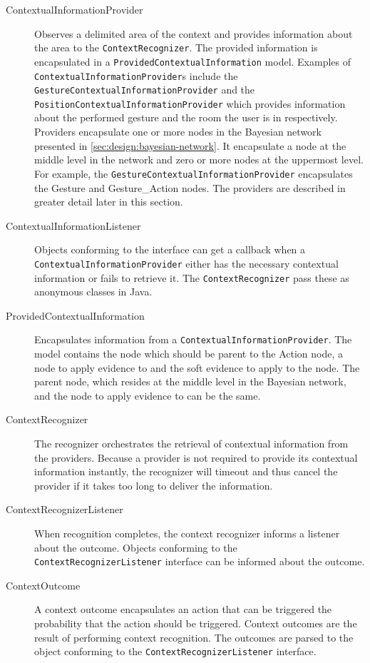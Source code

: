 \begin{description}
\item[ContextualInformationProvider] Observes a delimited area of the context and provides information about the area to the \texttt{ContextRecognizer}. The provided information is encapsulated in a \texttt{ProvidedContextualInformation} model. Examples of \texttt{ContextualInformationProvider}s include the \texttt{GestureContextualInformationProvider} and the \texttt{PositionContextualInformationProvider} which provides information about the performed gesture and the room the user is in respectively. Providers encapsulate one or more nodes in the Bayesian network presented in \cref{sec:design:bayesian-network}. It encapsulate a node at the middle level in the network and zero or more nodes at the uppermost level. For example, the \texttt{GestureContextualInformationProvider} encapsulates the Gesture and Gesture\_Action nodes. The providers are described in greater detail later in this section.
\item[ContextualInformationListener] Objects conforming to the interface can get a callback when a \texttt{ContextualInformationProvider} either has the necessary contextual information or fails to retrieve it. The \texttt{ContextRecognizer} pass these as anonymous classes in Java.
\item[ProvidedContextualInformation] Encapsulates information from a \texttt{ContextualInformationProvider}. The model contains the node which should be parent to the Action node, a node to apply evidence to and the soft evidence to apply to the node. The parent node, which resides at the middle level in the Bayesian network, and the node to apply evidence to can be the same.
\item[ContextRecognizer] The recognizer orchestrates the retrieval of contextual information from the providers. Because a provider is not required to provide its contextual information instantly, the recognizer will timeout and thus cancel the provider if it takes too long to deliver the information.
\item[ContextRecognizerListener] When recognition completes, the context recognizer informs a listener about the outcome. Objects conforming to the \texttt{ContextRecognizerListener} interface can be informed about the outcome.
\item[ContextOutcome] A context outcome encapsulates an action that can be triggered the probability that the action should be triggered. Context outcomes are the result of performing context recognition. The outcomes are parsed to the object conforming to the \texttt{ContextRecognizerListener} interface.
\end{description}

